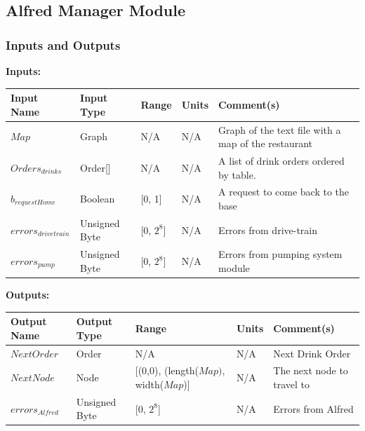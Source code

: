 \documentclass [10pt]{article}
\begin{document}

\subsection{Alfred Manager Module}


\subsubsection{Inputs and Outputs}


\textbf{Inputs: } \\

\begin{longtable}{|l|l|l|l|l|}\hline 
	\rowcolor{tableCell}\textbf{Input Name} & \textbf{Input Type} & \textbf{Range} & \textbf{Units} & \textbf{Comment(s)} \\ \hline
	$ Map $ & Graph & N/A & N/A & Graph of the text file with a map of the restaurant \\ \hline
	\rowcolor{tableCell}$ Orders_{drinks} $ & Order[] & N/A & N/A & A list of drink orders ordered by table. \\ \hline
	$ b_{requestHome} $ & Boolean & [0, 1]& N/A &  A request to come back to the base\\ \hline
	\rowcolor{tableCell}$ errors_{drivetrain} $ & Unsigned Byte & [0, $2^{8}$]& N/A & Errors from drive-train \\ \hline
	$  errors_{pump} $ & Unsigned Byte & [0, $2^{8}$]& N/A & Errors from pumping system module \\ \hline
\end{longtable}


\textbf{Outputs: } \\
\begin{longtable}{|l|l|l|l|l|}\hline 
	\rowcolor{tableCell}\textbf{Output Name} & \textbf{Output Type} & \textbf{Range} & \textbf{Units} & \textbf{Comment(s)} \\ \hline
	$ NextOrder $ & Order & N/A & N/A & Next Drink Order \\ \hline
	\rowcolor{tableCell}$ NextNode $ & Node & [(0,0), (length($Map)$, width($Map$)] & N/A & The next node to travel to \\ \hline
	$  errors_{Alfred} $ & Unsigned Byte & [0, $2^{8}$]& N/A & Errors from Alfred \\ \hline
\end{longtable}
\end{document}
